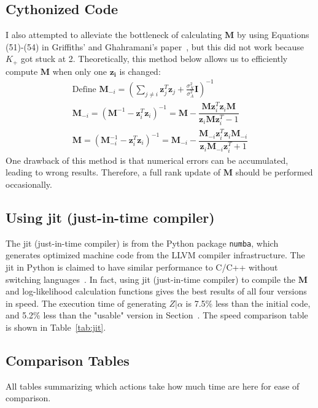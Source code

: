 \subsection{Cythonized Code}
I also attempted to alleviate the bottleneck of calculating $\mathbf{M}$ by using Equations (51)-(54) in Griffiths' and Ghahramani's paper~\cite{griffiths2005detailed}, but this did not work because $K_+$ got stuck at 2. Theoretically, this method below allows us to efficiently compute $\mathbf{M}$ when only one $\mathbf{z_i}$ is changed:
\begin{gather}
\text{Define } \mathbf{M}_{-i} = (\sum_{j \neq i}\mathbf{z}^T_j \mathbf{z}_j + \frac{\sigma_X^2}{\sigma_A^2}\mathbf{I})^{-1} \\
\mathbf{M}_{-i} = (\mathbf{M}^{-1} - \mathbf{z}^T_i \mathbf{z}_i)^{-1} 
= \mathbf{M} - \dfrac{\mathbf{M}\mathbf{z}^T_i \mathbf{z}_i\mathbf{M}}{\mathbf{z}_i\mathbf{M}\mathbf{z}^T_i - 1} \\
\mathbf{M} = (\mathbf{M}_{-i}^{-1} - \mathbf{z}^T_i \mathbf{z}_i)^{-1} 
= \mathbf{M}_{-i} - \dfrac{\mathbf{M}_{-i}\mathbf{z}^T_i \mathbf{z}_i\mathbf{M}_{-i}}{\mathbf{z}_i\mathbf{M}_{-i}\mathbf{z}^T_i + 1}
\end{gather}
One drawback of this method is that numerical errors can be accumulated, leading to wrong results. Therefore, a full rank update of $\mathbf{M}$ should be performed occasionally.

\subsection{Using jit (just-in-time compiler)}

The jit (just-in-time compiler) is from the Python package \texttt{numba}, which generates optimized machine code from the LLVM compiler infrastructure. The jit in Python is claimed to have similar performance to C/C++ without switching languages~\cite{numba}. In fact, using jit (just-in-time compiler) to compile the $\mathbf{M}$ and log-likelihood calculation functions gives the best results of all four versions in speed. The execution time of generating $Z|\alpha$ is 7.5\% less than the initial code, and 5.2\% less than the "usable" version in Section~\label{sub:usable}. The speed comparison table is shown in Table~\ref{tab:jit}.


\subsection{Comparison Tables}
All tables summarizing which actions take how much time are here for ease of comparison.

